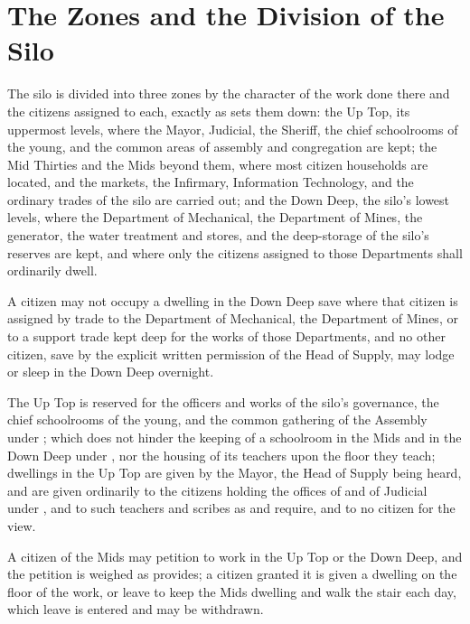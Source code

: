 \section{The Zones and the Division of the Silo}
\label{sec:housing:zones-and-the-division-of-the-silo}

The silo is divided into three zones by the character of the work done there and the citizens assigned to each, exactly as  sets them down: the Up Top, its uppermost levels, where the Mayor, Judicial, the Sheriff, the chief schoolrooms of the young, and the common areas of assembly and congregation are kept; the Mid Thirties and the Mids beyond them, where most citizen households are located, and the markets, the Infirmary, Information Technology, and the ordinary trades of the silo are carried out; and the Down Deep, the silo's lowest levels, where the Department of Mechanical, the Department of Mines, the generator, the water treatment and stores, and the deep-storage of the silo's reserves are kept, and where only the citizens assigned to those Departments shall ordinarily dwell.

\begin{clauses}
\item A citizen may not occupy a dwelling in the Down Deep save where that citizen is assigned by trade to the Department of Mechanical, the Department of Mines, or to a support trade kept deep for the works of those Departments, and no other citizen, save by the explicit written permission of the Head of Supply, may lodge or sleep in the Down Deep overnight.
\item The Up Top is reserved for the officers and works of the silo's governance, the chief schoolrooms of the young, and the common gathering of the Assembly under ; which does not hinder the keeping of a schoolroom in the Mids and in the Down Deep under , nor the housing of its teachers upon the floor they teach; dwellings in the Up Top are given by the Mayor, the Head of Supply being heard, and are given ordinarily to the citizens holding the offices of  and of Judicial under , and to such teachers and scribes as  and  require, and to no citizen for the view.
\item A citizen of the Mids may petition to work in the Up Top or the Down Deep, and the petition is weighed as  provides; a citizen granted it is given a dwelling on the floor of the work, or leave to keep the Mids dwelling and walk the stair each day, which leave is entered and may be withdrawn.
\end{clauses}

